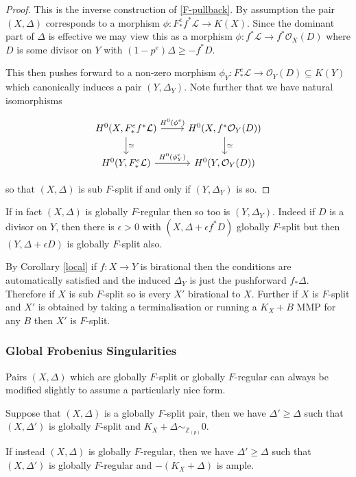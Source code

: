 \documentclass[a4paper,12pt]{book}
\newcommand{\ox}[1][X]{\mathcal{O}_{#1}}
\newcommand{\zp}{\mathbb{Z}_{(p)}}
\begin{document}
\begin{proof}
	
	This is the inverse construction of \autoref{F-pullback}. By assumption the pair $(X,\Delta)$ corresponds to a morphism $\phi:F_{*}^{e}f^{*}\mathcal{L} \to K(X)$. Since the dominant part of $\Delta$ is effective we may view this as a morphism $\phi: f^{*}\mathcal{L} \to f^{*}\ox(D)$ where $D$ is some divisor on $Y$ with $(1-p^{e}) \Delta \geq -f^{*}D$.
	
	This then pushes forward to a non-zero morphism $\phi_{Y}:F_{*}^{e}\mathcal{L} \to \ox[Y](D) \subseteq K(Y)$ which canonically induces a pair $(Y,\Delta_{Y})$. Note further that we have natural isomorphisms

	\[\begin{tikzcd}
	{H^{0}(X,F_{*}^{e}f^{*}\mathcal{L})} \arrow[r, "H^{0}(\phi^{e})"] \arrow[d, "\simeq "] & {H^{0}(X,f^{*}\ox[Y](D))} \arrow[d, "\simeq"] \\
	{H^{0}(Y,F_{*}^{e}\mathcal{L})} \arrow[r, "H^{0}(\phi_{Y}^{e})"]                       & {H^{0}(Y,\ox[Y](D))}                         
	\end{tikzcd}\]
	
	so that $(X,\Delta)$ is sub $F$-split if and only if $(Y,\Delta_{Y})$ is so.	
\end{proof}

If in fact $(X,\Delta)$ is globally $F$-regular then so too is $(Y,\Delta_{Y})$. Indeed if $D$ is a divisor on $Y$, then there is $\epsilon > 0$ with $(X,\Delta+\epsilon f^{*}D)$ globally $F$-split but then $(Y,\Delta+\epsilon D)$ is globally $F$-split also.

By Corollary \ref{local} if $f:X \to Y$ is birational then the conditions are automatically satisfied and the induced $\Delta_{Y}$ is just the pushforward $f_{*}\Delta$. Therefore if $X$ is sub $F$-split so is every $X'$ birational to $X$. Further if $X$ is $F$-split and $X'$ is obtained by taking a terminalisation or running a $K_{X}+B$ MMP for any $B$ then $X'$ is $F$-split.

\subsubsection{Global Frobenius Singularities}

Pairs $(X,\Delta)$ which are globally $F$-split or globally $F$-regular can always be modified slightly to assume a particularly nice form.

\begin{lemma}
	
	Suppose that $(X,\Delta)$ is a globally $F$-split pair, then we have $\Delta' \geq \Delta$ such that $(X,\Delta')$ is globally $F$-split and $K_{X}+\Delta \sim_{\zp} 0 $.
	
	If instead $(X,\Delta)$ is globally $F$-regular, then we have $\Delta' \geq \Delta$ such that $(X,\Delta')$ is globally $F$-regular and $-(K_{X}+\Delta)$ is ample.
	
	\end{lemma}
\end{document}
